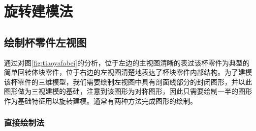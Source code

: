 \section{旋转建模法}
\subsection{绘制杯零件左视图}\label{sec:beilingjianleft}
通过对图\ref{fig:tiaoyafabei}的分析，位于左边的主视图清晰的表过该杯零件为典型的简单回转体块零件，位于右边的左视图清楚地表达了杯块零件内部结构。为了建模该杯零件的三维模型，我们需要绘制左视图中具有剖面线部分的封闭图形，并以此图形做为三视建模的基础，注意到该图形为对称图形，因此只需要绘制一半的图形作为基础特征用以旋转建模。通常有两种方法完成图形的绘制。
\subsubsection{直接绘制法}

